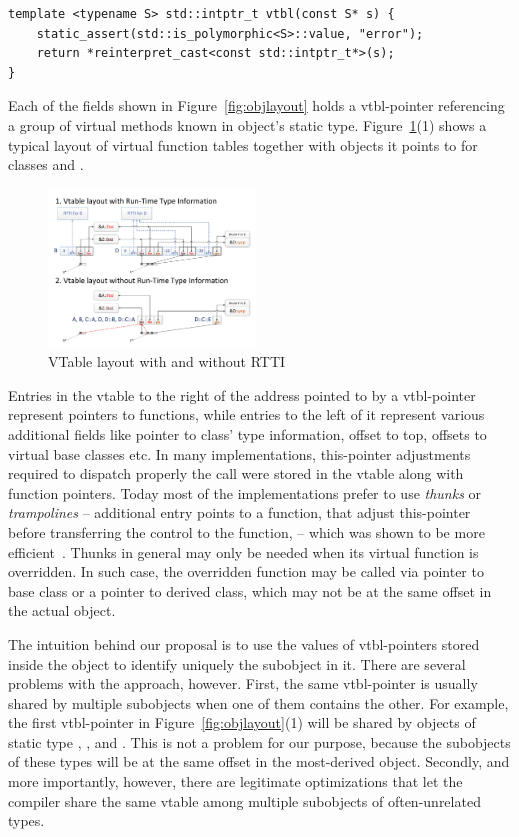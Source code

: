 \begin{lstlisting}
template <typename S> std::intptr_t vtbl(const S* s) {
    static_assert(std::is_polymorphic<S>::value, "error");
    return *reinterpret_cast<const std::intptr_t*>(s);
}
\end{lstlisting}

\noindent
Each of the  fields shown in Figure~\ref{fig:objlayout} holds a 
vtbl-pointer referencing a group of virtual methods known in object's static 
type. Figure~\ref{fig:vtbl}(1) shows a typical layout of virtual function tables 
together with objects it points to for classes  and .

\noindent
\begin{figure}[htbp]
  \centering
    \includegraphics[width=0.49\textwidth]{v-table.pdf}
  \caption{VTable layout with and without RTTI}
  \label{fig:vtbl}
\end{figure}

Entries in the vtable to the right of the address pointed to by a vtbl-pointer 
represent pointers to functions, while entries to the left of it represent 
various additional fields like pointer to class' type information, offset to 
top, offsets to virtual base classes etc. In many implementations, this-pointer 
adjustments required to dispatch properly the call were stored in the vtable 
along with function pointers. Today most of the implementations prefer to use 
\emph{thunks} or \emph{trampolines} -- additional entry points to a function, 
that adjust this-pointer before transferring the control to the function, -- 
which was shown to be more efficient~\cite{Driesen96}. Thunks in general may 
only be needed when its virtual function is overridden. In such case, the 
overridden function may be called via pointer to base class or a pointer to 
derived class, which may not be at the same offset in the actual object.

The intuition behind our proposal is to use the values of vtbl-pointers stored 
inside the object to identify uniquely the subobject in it. There are several 
problems with the approach, however. First, the same vtbl-pointer is 
usually shared by multiple subobjects when one of them contains the other. For 
example, the first vtbl-pointer in Figure~\ref{fig:objlayout}(1) will be shared 
by objects of static type , ,  and . This is 
not a problem for our purpose, because the subobjects of these types will be at 
the same offset in the most-derived object. Secondly, and more importantly, 
however, there are legitimate optimizations that let the compiler share the same 
vtable among multiple subobjects of often-unrelated types.

